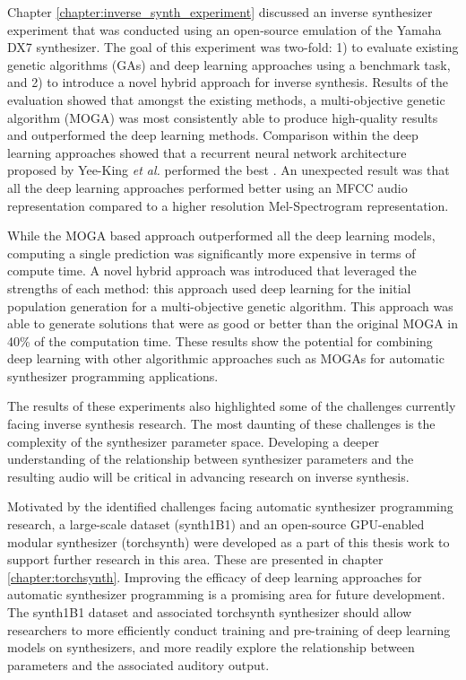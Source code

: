 Chapter \ref{chapter:inverse_synth_experiment} discussed an inverse synthesizer experiment that was conducted using an open-source emulation of the Yamaha DX7 synthesizer. The goal of this experiment was two-fold: 1) to evaluate existing genetic algorithms (GAs) and deep learning approaches using a benchmark task, and 2) to introduce a novel hybrid approach for inverse synthesis. Results of the evaluation showed that amongst the existing methods, a multi-objective genetic algorithm (MOGA) \cite{tatar2016automatic} was most consistently able to produce high-quality results and outperformed the deep learning methods. Comparison within the deep learning approaches showed that a recurrent neural network architecture proposed by Yee-King \textit{et al.} performed the best \cite{yee2018automatic}. An unexpected result was that all the deep learning approaches performed better using an MFCC audio representation compared to a higher resolution Mel-Spectrogram representation. 

While the MOGA based approach outperformed all the deep learning models, computing a single prediction was significantly more expensive in terms of compute time. A novel hybrid approach was introduced that leveraged the strengths of each method: this approach used deep learning for the initial population generation for a multi-objective genetic algorithm. This approach was able to generate solutions that were as good or better than the original MOGA in 40\% of the computation time. These results show the potential for combining deep learning with other algorithmic approaches such as MOGAs for automatic synthesizer programming applications.

The results of these experiments also highlighted some of the challenges currently facing inverse synthesis research. The most daunting of these challenges is the complexity of the synthesizer parameter space. %
Developing a deeper understanding of the relationship between synthesizer parameters and the resulting audio will be critical in advancing research on inverse synthesis.

Motivated by the identified challenges facing automatic synthesizer programming research, a large-scale dataset (synth1B1) and an open-source GPU-enabled modular synthesizer (torchsynth) were developed as a part of this thesis work to support further research in this area. These are presented in chapter \ref{chapter:torchsynth}. Improving the efficacy of deep learning approaches for automatic synthesizer programming is a promising area for future development. The synth1B1 dataset and associated torchsynth synthesizer should allow researchers to more efficiently conduct training and pre-training of deep learning models on synthesizers, and more readily explore the relationship between parameters and the associated auditory output. 

